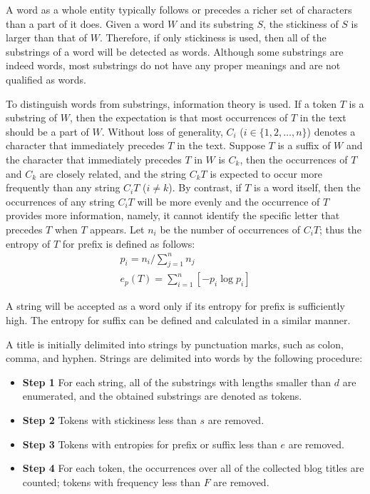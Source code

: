 \documentclass[review,3p,times,12pt,number]{elsarticle}
\begin{document}
A word as a whole entity typically follows or precedes a richer set of characters than a part of it does.
Given a word $W$ and its substring $S$, the stickiness of $S$ is larger than that of $W$. Therefore, if only stickiness is used, then all of the substrings of a word will be detected as words. Although some substrings are indeed words, most substrings do not have any proper meanings and are not qualified as words.

To distinguish words from substrings, information theory is used. If a token $T$ is a substring of $W$, then the expectation is that most occurrences of $T$ in the text should be a part of $W$. Without loss of generality, $C_i$ ($i\in \{1, 2, \ldots, n\}$) denotes a character that immediately precedes $T$ in the text. Suppose $T$ is a suffix of $W$ and the character that immediately precedes $T$ in $W$ is $C_k$, then the occurrences of $T$ and $C_k$ are closely related, and the string $C_kT$ is expected to occur more frequently than any string $C_iT$ ($i\neq k$). By contrast, if $T$ is a word itself, then the occurrences of any string $C_iT$ will be more evenly and the occurrence of $T$ provides more information, namely, it cannot identify the specific letter that precedes $T$ when $T$ appears. Let $n_i$ be the number of occurrences of $C_iT$; thus the entropy of $T$ for prefix is defined as follows:
\begin{equation}
\begin{split}
\label{eqn:entropy}
p_i = n_i / \sum_{j=1}^n n_j \\
e_p(T)= \sum_{i=1}^n[-p_i\log{p_i}]
\end{split}
\end{equation}

A string will be accepted as a word only if its entropy for prefix is sufficiently high. The entropy for suffix can be defined and calculated in a similar manner.

A title is initially delimited into strings by punctuation marks, such as colon, comma, and hyphen. Strings are delimited into words by the following procedure:
\begin{itemize}
    \item {\bf Step 1} For each string, all of the substrings with lengths smaller than $d$ are enumerated, and the obtained substrings are denoted as tokens.
    \item {\bf Step 2}  Tokens with stickiness less than $s$ are removed.
    \item {\bf Step 3} Tokens with entropies for prefix or suffix less than $e$ are removed.
    \item {\bf Step 4} For each token, the occurrences over all of the collected blog titles are counted; tokens with frequency less than $F$ are removed.
\end{itemize}
\end{document}
